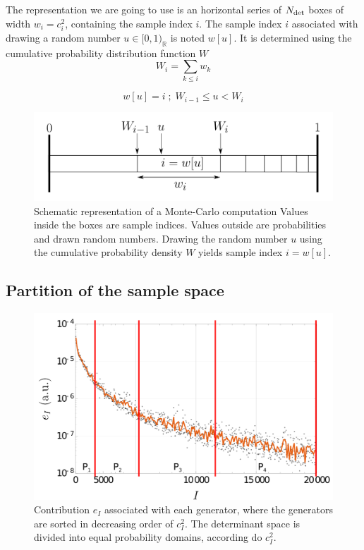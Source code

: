 \documentclass[./thesis.tex]{subfiles}
\begin{document}
The representation we are going to use is an horizontal series of ${N_\text{det}}$ boxes of width $w_i = c_i^2$, containing the sample index $i$.
The sample index $i$ associated with drawing a random number $u \in [0,1)_\mathbb{R}$ is noted $w[u]$. It is determined using the cumulative probability distribution function $W$
\begin{equation}
W_i = \sum_{k \leq i} w_k
\end{equation}

\begin{equation}
w[u] = i \; ; \; W_{i-1} \leq u < W_i
\end{equation}


\begin{figure}[h!]
	\begin{center}
		\includegraphics[width=0.7\columnwidth]{figures/pt2/mc_representation}
	\end{center}
	\caption{Schematic representation of a Monte-Carlo computation
Values inside the boxes are sample indices. Values outside are probabilities and drawn random numbers.
Drawing the random number $u$ using the cumulative probability density $W$ yields sample index $i=w[u]$.}
	\label{fig:mc_representation}
\end{figure}




\subsection{Partition of the sample space}
\label{sec:partition}


\begin{figure}[h!]
	\begin{center}
		\includegraphics[width=0.7\columnwidth]{figures/pt2/P_i}
	\end{center}
	\caption{Contribution $e_I$ associated with each generator, where the generators are sorted in decreasing order of $c_I^2$. The determinant space is divided into equal probability domains, according do $c_I^2$.}
	\label{fig:p_i}
\end{figure}
\end{document}
